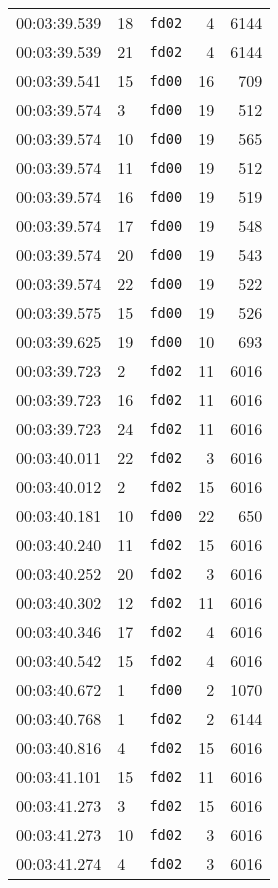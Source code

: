 \documentclass{article}
\begin{document}
\begin{longtable}{lllrr}
00:03:39.539 & 18 & \texttt{fd02} & 4 & 6144 \\
00:03:39.539 & 21 & \texttt{fd02} & 4 & 6144 \\
00:03:39.541 & 15 & \texttt{fd00} & 16 & 709 \\
00:03:39.574 & 3 & \texttt{fd00} & 19 & 512 \\
00:03:39.574 & 10 & \texttt{fd00} & 19 & 565 \\
00:03:39.574 & 11 & \texttt{fd00} & 19 & 512 \\
00:03:39.574 & 16 & \texttt{fd00} & 19 & 519 \\
00:03:39.574 & 17 & \texttt{fd00} & 19 & 548 \\
00:03:39.574 & 20 & \texttt{fd00} & 19 & 543 \\
00:03:39.574 & 22 & \texttt{fd00} & 19 & 522 \\
00:03:39.575 & 15 & \texttt{fd00} & 19 & 526 \\
00:03:39.625 & 19 & \texttt{fd00} & 10 & 693 \\
00:03:39.723 & 2 & \texttt{fd02} & 11 & 6016 \\
00:03:39.723 & 16 & \texttt{fd02} & 11 & 6016 \\
00:03:39.723 & 24 & \texttt{fd02} & 11 & 6016 \\
00:03:40.011 & 22 & \texttt{fd02} & 3 & 6016 \\
00:03:40.012 & 2 & \texttt{fd02} & 15 & 6016 \\
00:03:40.181 & 10 & \texttt{fd00} & 22 & 650 \\
00:03:40.240 & 11 & \texttt{fd02} & 15 & 6016 \\
00:03:40.252 & 20 & \texttt{fd02} & 3 & 6016 \\
00:03:40.302 & 12 & \texttt{fd02} & 11 & 6016 \\
00:03:40.346 & 17 & \texttt{fd02} & 4 & 6016 \\
00:03:40.542 & 15 & \texttt{fd02} & 4 & 6016 \\
00:03:40.672 & 1 & \texttt{fd00} & 2 & 1070 \\
00:03:40.768 & 1 & \texttt{fd02} & 2 & 6144 \\
00:03:40.816 & 4 & \texttt{fd02} & 15 & 6016 \\
00:03:41.101 & 15 & \texttt{fd02} & 11 & 6016 \\
00:03:41.273 & 3 & \texttt{fd02} & 15 & 6016 \\
00:03:41.273 & 10 & \texttt{fd02} & 3 & 6016 \\
00:03:41.274 & 4 & \texttt{fd02} & 3 & 6016 \\

\end{longtable}
\end{document}
